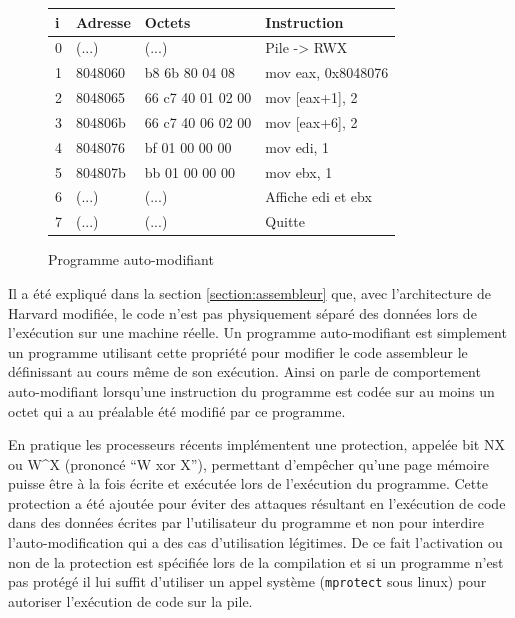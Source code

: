 \begin{figure}
\begin{center}
\begin{tabular}[b]{|l|l|l|l|}
\hline
i & Adresse & Octets & Instruction\\ 
\hline
0 &  (...)   &  (...)                  &  Pile -> RWX \\ 
1 & 8048060  &  b8 6b 80 04 08         &  mov    eax, 0x8048076\\
2 & 8048065  &  66 c7 40 01 02 00      &  mov    [eax+1], 2 \\
3 & 804806b  &  66 c7 40 06 02 00      &  mov    [eax+6], 2 \\
4 & 8048076  &  bf 01 00 00 00         &  mov    edi, 1 \\
5 & 804807b  &  bb 01 00 00 00         &  mov    ebx, 1 \\
6 &  (...)   &  (...)		       &  Affiche edi et ebx \\
7 &  (...)   &  (...)		       &  Quitte \\
\hline
\end{tabular}
\end{center}
\caption{Programme auto-modifiant}
\label{fig:easy_sm}
\end{figure}


Il a été expliqué dans la section \ref{section:assembleur} que, avec l'architecture de Harvard modifiée, le code n'est pas physiquement séparé des données lors de l'exécution sur une machine réelle.
Un programme auto-modifiant est simplement un programme utilisant cette propriété pour modifier le code assembleur le définissant au cours même de son exécution.
Ainsi on parle de comportement auto-modifiant lorsqu'une instruction du programme est codée sur au moins un octet qui a au préalable été modifié par ce programme.

En pratique les processeurs récents implémentent une protection, appelée bit NX ou W\textasciicircum X (prononcé ``W xor X''), permettant d'empêcher qu'une page mémoire puisse être à la fois écrite et exécutée lors de l'exécution du programme.
Cette protection a été ajoutée pour éviter des attaques résultant en l'exécution de code dans des données écrites par l'utilisateur du programme et non pour interdire l'auto-modification qui a des cas d'utilisation légitimes.
De ce fait l'activation ou non de la protection est spécifiée lors de la compilation et si un programme n'est pas protégé il lui suffit d'utiliser un appel système (\texttt{mprotect} sous linux) pour autoriser l'exécution de code sur la pile.

